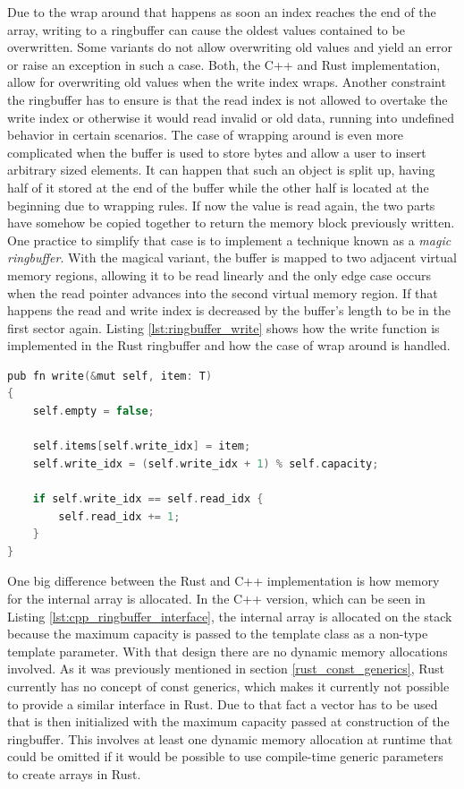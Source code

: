 Due to the wrap around that happens as soon an index reaches the end of the array, writing to a ringbuffer can cause the oldest values contained to be overwritten. Some variants do not allow overwriting old values and yield an error or raise an exception in such a case. Both, the C++ and Rust implementation, allow for overwriting old values when the write index wraps. Another constraint the ringbuffer has to ensure is that the read index is not allowed to overtake the write index or otherwise it would read invalid or old data, running into undefined behavior in certain scenarios. The case of wrapping around is even more complicated when the buffer is used to store bytes and allow a user to insert arbitrary sized elements. It can happen that such an object is split up, having half of it stored at the end of the buffer while the other half is located at the beginning due to wrapping rules. If now the value is read again, the two parts have somehow be copied together to return the memory block previously written. One practice to simplify that case is to implement a technique known as a \textit{magic ringbuffer}. With the magical variant, the buffer is mapped to two adjacent virtual memory regions, allowing it to be read linearly and the only edge case occurs when the read pointer advances into the second virtual memory region. If that happens the read and write index is decreased by the buffer's length to be in the first sector again. Listing \ref{lst:ringbuffer_write} shows how the write function is implemented in the Rust ringbuffer and how the case of wrap around is handled.\\

\begin{lstlisting}[caption={Write function of the Rust ringbuffer showing how the wrap around case is handled}, label={lst:ringbuffer_write}, language={C++}]
pub fn write(&mut self, item: T) 
{
	self.empty = false;
	
	self.items[self.write_idx] = item;
	self.write_idx = (self.write_idx + 1) % self.capacity;
	
	if self.write_idx == self.read_idx {
		self.read_idx += 1;
	}
}
\end{lstlisting}

\noindent
One big difference between the Rust and C++ implementation is how memory for the internal array is allocated. In the C++ version, which can be seen in Listing \ref{lst:cpp_ringbuffer_interface}, the internal array is allocated on the stack because the maximum capacity is passed to the template class as a non-type template parameter. With that design there are no dynamic memory allocations involved.  As it was previously mentioned in section \ref{rust_const_generics}, Rust currently has no concept of const generics, which makes it currently not possible to provide a similar interface in Rust. Due to that fact a vector has to be used that is then initialized with the maximum capacity passed at construction of the ringbuffer. This involves at least one dynamic memory allocation at runtime that could be omitted if it would be possible to use compile-time generic parameters to create arrays in Rust.\\

